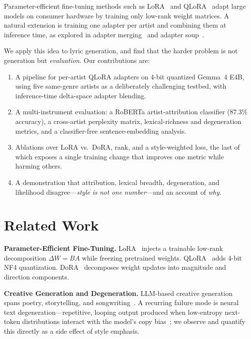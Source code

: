 \documentclass[runningheads]{llncs}
\begin{document}
Parameter-efficient fine-tuning methods such as LoRA~\cite{hu2022lora} and QLoRA~\cite{dettmers2023qlora} adapt large models on consumer hardware by training only low-rank weight matrices. A natural extension is training one adapter per artist and combining them at inference time, as explored in adapter merging~\cite{zhang2023lorahub} and adapter soup~\cite{chronopoulou2023adaptersoup}.

We apply this idea to lyric generation, and find that the harder problem is not generation but \emph{evaluation}. Our contributions are:
\begin{enumerate}
    \item A pipeline for per-artist QLoRA adapters on 4-bit quantized Gemma~4 E4B, using five same-genre artists as a deliberately challenging testbed, with inference-time delta-space adapter blending.
    \item A multi-instrument evaluation: a RoBERTa artist-attribution classifier (87.3\% accuracy), a cross-artist perplexity matrix, lexical-richness and degeneration metrics, and a classifier-free sentence-embedding analysis.
    \item Ablations over LoRA vs.\ DoRA, rank, and a style-weighted loss, the last of which exposes a single training change that improves one metric while harming others.
    \item A demonstration that attribution, lexical breadth, degeneration, and likelihood disagree---\emph{style is not one number}---and an account of \emph{why}.
\end{enumerate}

\section{Related Work}
\label{sec:related}

\textbf{Parameter-Efficient Fine-Tuning.}
LoRA~\cite{hu2022lora} injects a trainable low-rank decomposition $\Delta W = BA$ while freezing pretrained weights. QLoRA~\cite{dettmers2023qlora} adds 4-bit NF4 quantization. DoRA~\cite{liu2024dora} decomposes weight updates into magnitude and direction components.

\textbf{Creative Generation and Degeneration.}
LLM-based creative generation spans poetry, storytelling, and songwriting~\cite{vonrutte2023language}. A recurring failure mode is neural text degeneration---repetitive, looping output produced when low-entropy next-token distributions interact with the model's copy bias~\cite{holtzman2020degeneration}; we observe and quantify this directly as a side effect of style emphasis.
\end{document}
